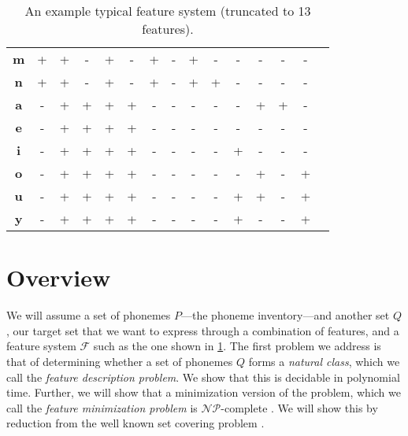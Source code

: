 \documentclass[11pt,a4paper]{article}
\begin{document}
\begin{table}
\begin{adjustbox}{width=\columnwidth}
{\begin{tabular}{c|cccccccccccccc}
\textbf{m} &  +   &  +  &  -  &  +  &  -   &  +  &  -  &  +  &  -  & -  & -  & -  & - \\ 
\textbf{n} &  +   &  +  &  -  &  +  &  -   &  +  &  -  &  +  &  +  & -  & -  & -  & - \\ 
\textbf{a} &  -   &  +  &  +  &  +  &  +   &  -  &  -  &  -  &  -  & -  & +  & +  & - \\ 
\textbf{e} &  -   &  +  &  +  &  +  &  +   &  -  &  -  &  -  &  -  & -  & -  & -  & - \\ 
\textbf{i} &  -   &  +  &  +  &  +  &  +   &  -  &  -  &  -  &  -  & +  & -  & -  & - \\ 
\textbf{o} &  -   &  +  &  +  &  +  &  +   &  -  &  -  &  -  &  -  & -  & +  & -  & + \\ 
\textbf{u} &  -   &  +  &  +  &  +  &  +   &  -  &  -  &  -  &  -  & +  & +  & -  & + \\ 
\textbf{y} &  -   &  +  &  +  &  +  &  +   &  -  &  -  &  -  &  -  & +  & -  & -  & + \\ 
\bottomrule
\end{tabular}
}
\end{adjustbox}
\caption{An example typical feature system (truncated to 13 features).}
\label{examplefeatures}
\end{table}

\section{Overview}

\newcommand{\fancyc}{\mathcal{C}}
\newcommand{\fancyf}{\mathcal{F}}
\newcommand{\fancys}{\mathcal{S}}

We will assume a set of phonemes $P$---the phoneme inventory---and another set $Q$, our target set that we want to express through a combination of features, and a feature system $\fancyf$ such as the one shown in \cref{examplefeatures}.  The first problem we address is that of determining whether a set of phonemes $Q$ forms a {\it natural class}, which we call the {\it feature description problem}. We show that this is decidable in polynomial time.  
Further, we will show that 
a minimization version of the problem, which we call the {\it feature minimization problem} is $\mathcal{NP}$-complete \cite{garey1979,sipser2013}.  We will show this by reduction from the well known set covering problem \citep{karp1972}.
\end{document}
